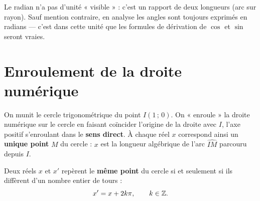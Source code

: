 \begin{remarque}
Le radian n'a pas d'unité « visible » : c'est un rapport de deux longueurs (arc
sur rayon). Sauf mention contraire, en analyse les angles sont toujours exprimés
en radians — c'est dans cette unité que les formules de dérivation de $\cos$ et
$\sin$ seront vraies.
\end{remarque}

\section{Enroulement de la droite numérique}

\begin{definition}[Enroulement]
On munit le cercle trigonométrique du point $I(1\,;\,0)$. On « enroule » la droite
numérique sur le cercle en faisant coïncider l'origine de la droite avec $I$, l'axe
positif s'enroulant dans le \textbf{sens direct}. À chaque réel $x$ correspond ainsi
un \textbf{unique point} $M$ du cercle : $x$ est la longueur algébrique de l'arc
$\widehat{IM}$ parcouru depuis $I$.
\end{definition}

\begin{propriete}
Deux réels $x$ et $x'$ repèrent le \textbf{même point} du cercle si et seulement
si ils diffèrent d'un nombre entier de tours :
\[ x' = x + 2k\pi, \qquad k\in\mathbb{Z}. \]
\end{propriete}

\begin{illus}
\end{illus}

